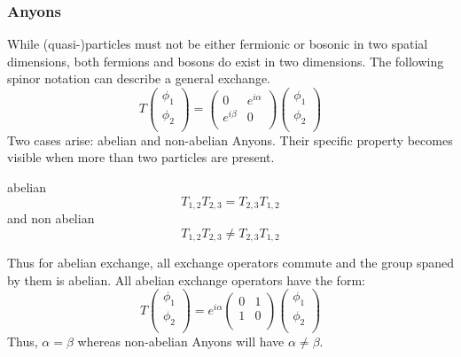 \documentclass[Master]{subfiles}
\begin{document}
\subsubsection{Anyons}
While (quasi-)particles must not be either fermionic or bosonic in two spatial dimensions, both fermions and bosons do exist in two dimensions. The following spinor notation can describe a general exchange.
\begin{dmath}
T
 \left(
\begin{array}{c}
 \phi _1 \\
 \phi _2 \\
\end{array}
\right)=\left(
\begin{array}{cc}
 0 & e^{i\alpha}  \\
e^{i \beta}  & 0 \\
\end{array}
\right)
\left(
\begin{array}{c}
 \phi _1 \\
 \phi _2 \\
\end{array}
\right) 
\end{dmath}
Two cases arise: abelian and non-abelian Anyons. Their specific property becomes visible when more than two particles are present.
\begin{center}
abelian 
$$T_{1,2}T_{2,3}=T_{2,3}T_{1,2}$$
and non abelian
$$T_{1,2}T_{2,3}\neq T_{2,3}T_{1,2}$$
\end{center}
Thus for abelian exchange, all exchange operators commute and the group spaned by them is abelian.
All abelian exchange operators have the form: 
\begin{dmath}
T
 \left(
\begin{array}{c}
 \phi _1 \\
 \phi _2 \\
\end{array}
\right)=e^{i \alpha}\left(
\begin{array}{cc}
 0 & 1  \\
 1  & 0 \\
\end{array}
\right)
\left(
\begin{array}{c}
 \phi _1 \\
 \phi _2 \\
\end{array}
\right) 
\end{dmath}
Thus, $\alpha = \beta$   
whereas non-abelian Anyons will have $\alpha \neq \beta$.
\end{document}

